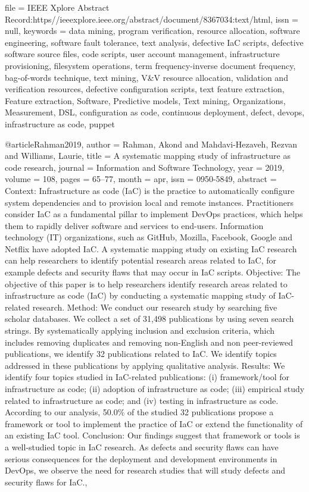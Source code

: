 {  file      = {IEEE Xplore Abstract Record:https\://ieeexplore.ieee.org/abstract/document/8367034:text/html},
  issn      = {null},
  keywords  = {data mining, program verification, resource allocation, software engineering, software fault tolerance, text analysis, defective IaC scripts, defective software source files, code scripts, user account management, infrastructure provisioning, filesystem operations, term frequency-inverse document frequency, bag-of-words technique, text mining, V\&V resource allocation, validation and verification resources, defective configuration scripts, text feature extraction, Feature extraction, Software, Predictive models, Text mining, Organizations, Measurement, DSL, configuration as code, continuous deployment, defect, devops, infrastructure as code, puppet}
}

@article{Rahman2019,
  author   = {Rahman, Akond and Mahdavi-Hezaveh, Rezvan and Williams, Laurie},
  title    = {A systematic mapping study of infrastructure as code research},
  journal  = {Information and Software Technology},
  year     = {2019},
  volume   = {108},
  pages    = {65--77},
  month    = apr,
  issn     = {0950-5849},
  abstract = {Context: Infrastructure as code (IaC) is the practice to automatically configure system dependencies and to provision local and remote instances. Practitioners consider IaC as a fundamental pillar to implement DevOps practices, which helps them to rapidly deliver software and services to end-users. Information technology (IT) organizations, such as GitHub, Mozilla, Facebook, Google and Netflix have adopted IaC. A systematic mapping study on existing IaC research can help researchers to identify potential research areas related to IaC, for example defects and security flaws that may occur in IaC scripts. Objective: The objective of this paper is to help researchers identify research areas related to infrastructure as code (IaC) by conducting a systematic mapping study of IaC-related research. Method: We conduct our research study by searching five scholar databases. We collect a set of 31,498 publications by using seven search strings. By systematically applying inclusion and exclusion criteria, which includes removing duplicates and removing non-English and non peer-reviewed publications, we identify 32 publications related to IaC. We identify topics addressed in these publications by applying qualitative analysis. Results: We identify four topics studied in IaC-related publications: (i) framework/tool for infrastructure as code; (ii) adoption of infrastructure as code; (iii) empirical study related to infrastructure as code; and (iv) testing in infrastructure as code. According to our analysis, 50.0\% of the studied 32 publications propose a framework or tool to implement the practice of IaC or extend the functionality of an existing IaC tool. Conclusion: Our findings suggest that framework or tools is a well-studied topic in IaC research. As defects and security flaws can have serious consequences for the deployment and development environments in DevOps, we observe the need for research studies that will study defects and security flaws for IaC.},
}
